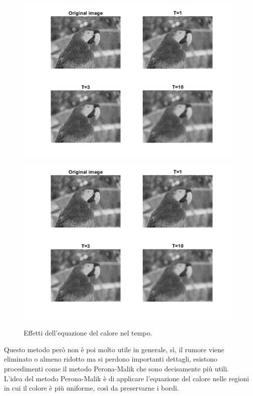 \begin{figure}[h!] 
\centering
\includegraphics[scale=0.27, trim = 0 12.3cm 1.9cm 1.9cm, clip]{Pictures/Risultati/eq del calore.png}
\includegraphics[scale=0.27, trim = 1.9cm 1.7cm 1.9cm 10.3cm, clip]{Pictures/Risultati/eq del calore.png}
\caption{Effetti dell'equazione del calore nel tempo.}\label{fig:figura}
\end{figure}


Questo metodo però non è poi molto utile in generale, sì, il rumore viene eliminato o almeno ridotto ma si perdono importanti dettagli, esistono procedimenti come il metodo Perona-Malik che sono decisamente più utili.\\
L'idea del metodo Perona-Malik è di applicare l'equazione del calore nelle regioni in cui il colore è più uniforme, così da preservarne i bordi.



